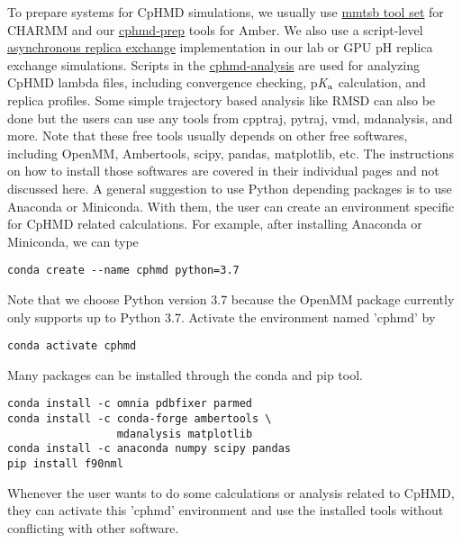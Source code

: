 \documentclass[9pt,tutorial]{livecoms}
\newcommand{\pka}{p\textit{K}$_{\rm a}$}
\begin{document}
To prepare systems for CpHMD simulations, we usually use \href{http://blue11.bch.msu.edu/mmtsb/Main_Page}{mmtsb tool set} for CHARMM and our \href{https://gitlab.com/shenlab-amber-cphmd/cphmd-prep}{cphmd-prep} tools for Amber. We also use a script-level \href{https://gitlab.com/shenlab-amber-cphmd/async_ph_replica_exchange}{asynchronous replica exchange} implementation in our lab or GPU pH replica exchange simulations. Scripts in the \href{https://gitlab.com/shenlab-amber-cphmd/cphmd-analysis}{cphmd-analysis} are used for analyzing CpHMD lambda files, including convergence checking, {\pka} calculation, and replica profiles. Some simple trajectory based analysis like RMSD can also be done but the users can use any tools from cpptraj, pytraj, vmd, mdanalysis, and more. Note that these free tools usually depends on other free softwares, including OpenMM, Ambertools, scipy, pandas, matplotlib, etc. The instructions on how to install those softwares are covered in their individual pages and not discussed here. A general suggestion to use Python depending packages is to use Anaconda or Miniconda. With them, the user can create an environment specific for CpHMD related calculations. For example, after installing Anaconda or Miniconda, we can type 
\begin{lstlisting}
conda create --name cphmd python=3.7
\end{lstlisting}
Note that we choose Python version 3.7 because the OpenMM package currently only supports up to Python 3.7. Activate the environment named 'cphmd' by
\begin{lstlisting}
conda activate cphmd
\end{lstlisting}
Many packages can be installed through the conda and pip tool.
\begin{lstlisting}
conda install -c omnia pdbfixer parmed
conda install -c conda-forge ambertools \
                 mdanalysis matplotlib 
conda install -c anaconda numpy scipy pandas 
pip install f90nml
\end{lstlisting}
Whenever the user wants to do some calculations or analysis related to CpHMD, they can activate this 'cphmd' environment and use the installed tools without conflicting with other software. 

\end{document}
